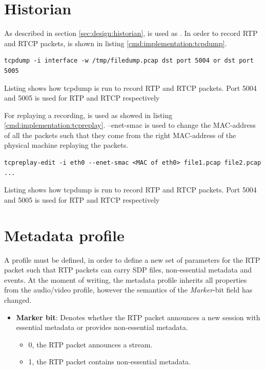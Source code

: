\section{Historian}
As described in section \ref{sec:design:historian},  is used as \hist{}.
In order to record RTP and RTCP packets,  is shown in listing \ref{cmd:implementation:tcpdump}.
\begin{listing}[h] 
\begin{verbatim}
tcpdump -i interface -w /tmp/filedump.pcap dst port 5004 or dst port 5005 
\end{verbatim}
\caption{Listing shows how tcpdump is run to record RTP and RTCP packets. Port 5004 and 5005 is used for RTP and RTCP respectively}
\label{cmd:implementation:tcpdump}
\end{listing}


For replaying a recording,  is used as showed in listing \ref{cmd:implementation:tcpreplay}. --enet-smac is used to change the MAC-address of all the packets such that they come from the right MAC-address of the physical machine replaying the packets.
\begin{listing}[h] 
	\begin{verbatim}
tcpreplay-edit -i eth0 --enet-smac <MAC of eth0> file1.pcap file2.pcap ...
	\end{verbatim}
\caption{Listing shows how tcpdump is run to record RTP and RTCP packets. Port 5004 and 5005 is used for RTP and RTCP respectively}
\label{cmd:implementation:tcpreplay}
\end{listing}

\section{Metadata profile} \label{sec:implementation:metadataprofile} 
A profile must be defined, in order to define a new set of parameters for the RTP packet such that RTP packets can carry SDP files, non-essential metadata and events. At the moment of writing, the metadata profile inherits all properties from the audio/video profile, however the semantics of the  \textit{Marker}-bit field has changed.

\begin{itemize}
	\item \textbf{Marker bit}: Denotes whether the RTP packet announces a new session with essential metadata or provides non-essential metadata.
		\begin{itemize}
			\item 0, the RTP packet announces a stream. 
			\item 1, the RTP packet contains non-essential metadata.
		\end{itemize}
\end{itemize}


